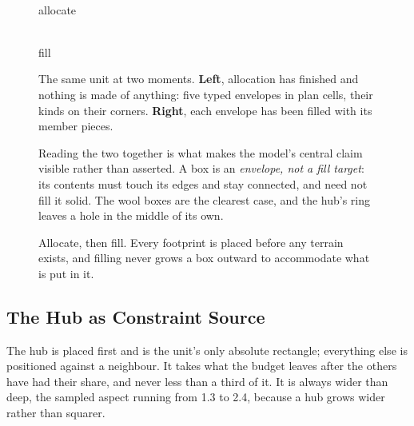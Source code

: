 \begin{figure}[htbp]
\centering
\begin{minipage}[b]{0.30\textwidth}\centering
  \\[5pt]
  {\footnotesize\sffamily\color{ink60} allocate}
\end{minipage}%
\hfill
\begin{minipage}[b]{0.30\textwidth}\centering
  \\[5pt]
  {\footnotesize\sffamily\color{ink60} fill}
\end{minipage}%
\hfill
\begin{minipage}[b]{0.34\textwidth}\small
The same unit at two moments. \textbf{Left}, allocation has finished and nothing is
made of anything: five typed envelopes in plan cells, their kinds on their corners.
\textbf{Right}, each envelope has been filled with its member pieces.

\medskip
Reading the two together is what makes the model's central claim visible rather
than asserted. A box is an \emph{envelope, not a fill target}: its contents must
touch its edges and stay connected, and need not fill it solid. The wool boxes are
the clearest case, and the hub's ring leaves a hole in the middle of its own.
\end{minipage}
\caption{Allocate, then fill. Every footprint is placed before any terrain exists,
and filling never grows a box outward to accommodate what is put in it.}
\label{fig:boxes}
\end{figure}

\subsection{The Hub as Constraint Source}

The hub is placed first and is the unit's only absolute rectangle; everything else
is positioned against a neighbour. It takes what the budget leaves after the
others have had their share, and never less than a third of it. It is always wider
than deep, the sampled aspect running from 1.3 to 2.4, because a hub grows wider
rather than squarer.

